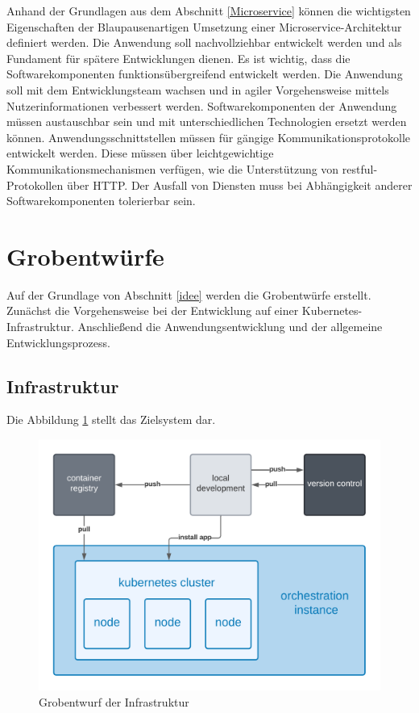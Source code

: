 Anhand der Grundlagen aus dem Abschnitt \ref{Microservice} können die wichtigsten Eigenschaften der Blaupausenartigen Umsetzung einer Microservice-Architektur definiert werden.
Die Anwendung soll nachvollziehbar entwickelt werden und als Fundament für spätere Entwicklungen dienen.
Es ist wichtig, dass die Softwarekomponenten funktionsübergreifend entwickelt werden.
Die Anwendung soll mit dem Entwicklungsteam wachsen und in agiler Vorgehensweise mittels Nutzerinformationen verbessert werden.
Softwarekomponenten der Anwendung müssen austauschbar sein und mit unterschiedlichen Technologien ersetzt werden können.
Anwendungsschnittstellen müssen für gängige Kommunikationsprotokolle entwickelt werden.
Diese müssen über leichtgewichtige Kommunikationsmechanismen verfügen, wie die Unterstützung von \acs{rest}ful-Protokollen über HTTP.
Der Ausfall von Diensten muss bei Abhängigkeit anderer Softwarekomponenten tolerierbar sein.

\section{Grobentwürfe}

Auf der Grundlage von Abschnitt \ref{idee} werden die Grobentwürfe erstellt.
Zunächst die Vorgehensweise bei der Entwicklung auf einer Kubernetes-Infrastruktur.
Anschließend die Anwendungsentwicklung und der allgemeine Entwicklungsprozess.

\subsection{Infrastruktur}
Die Abbildung \ref{fig:GrobentwurfInfrastruktur} stellt das Zielsystem dar.
\begin{figure}[!htb]
  \centering
  \includegraphics[width=0.8\columnwidth]{images/GrobentwurfInfrastruktur.png}
  \caption{Grobentwurf der Infrastruktur}
  \label{fig:GrobentwurfInfrastruktur}
\end{figure}

